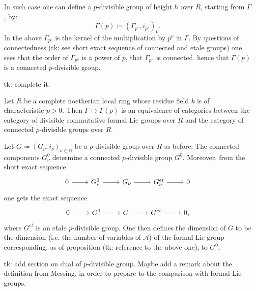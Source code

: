 \documentclass[../Main]{subfiles}
\begin{document}
\begin{ex}
	In such case one can define a $p$-divisible group of height $h$
	over $R$, starting from $\Gamma$, by:
	\begin{equation*}
		\Gamma(p) \coloneqq \left(\Gamma_{p^\nu}, i_{p^\nu}\right)_\nu
	.\end{equation*} 
	In the above $\Gamma_{p^\nu}$ is the kernel of the multiplication by $p^\nu$ 
	in $\Gamma$.
	By questions of connectedness (tk: see short exact sequence of connected
	and etale groups) one sees that the order of $\Gamma_{p^\nu}$
	is a power of $p$, that $\Gamma_{p^\nu}$ is connected.
	hence that $\Gamma(p)$ is a connected $p$-divisible group.

	tk: complete it.
\end{ex}

\begin{prop}[]
	Let $R$ be a complete noetherian local ring whose residue field $k$
	is of characteristic $p > 0$.
	Then $\Gamma \mapsto \Gamma(p)$ is an equivalence of categories
	between the category of divisible commutative formal Lie groups over $R$
	and the category of connected $p$-divisible groups over $R$.
\end{prop}

\begin{defn}
	Let $G \coloneqq \left(G_{\nu}, i_\nu\right)_{\nu \in \mathbb{N}}$ be a $p$-divisible group
	over $R$ as before.
	The connected components $G^0_\nu$ determine a connected $p$-divisible
	group $G^0$.
	Moreover, from the short exact sequence
	\begin{equation*}
	\begin{tikzcd}
		0 \arrow[r, "", rightarrow] &
		G^0_\nu \arrow[r, "", rightarrow] &
		G_\nu \arrow[r, "", rightarrow] &
		G^{et}_\nu \arrow[r, "", rightarrow] &
		0
	\end{tikzcd}
	\end{equation*}
	one gets the exact sequence
	\begin{equation*}
	\begin{tikzcd}
		0 \arrow[r, "", rightarrow] &
		G^0 \arrow[r, "", rightarrow] &
		G \arrow[r, "", rightarrow] &
		G^{et} \arrow[r, "", rightarrow] &
		0
	,\end{tikzcd}
	\end{equation*}
	where $G^{et}$ is an e\'tale $p$-divisible group.
	One then defines the dimension of $G$ to be the dimension 
	(i.e. the number of variables of $\mathscr{A}$)
	of the formal Lie group corresponding, as of proposition (tk: reference to the above one),
	to $G^0$.
\end{defn}


tk: add section on dual of $p$-divisible group. Maybe add a remark about
the definition from Messing, in order to prepare to
the comparison with formal Lie groups.
\end{document}

